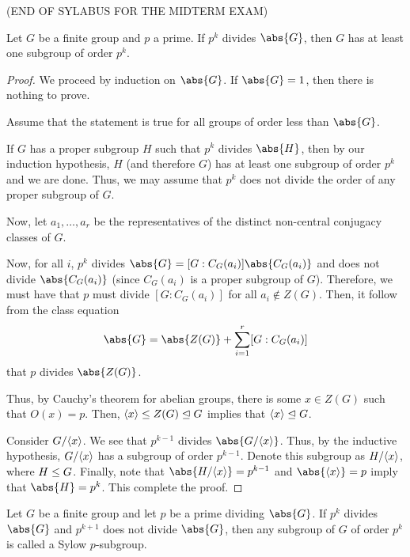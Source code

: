 \documentclass[11pt]{penrose}
\begin{document}
(END OF SYLABUS FOR THE MIDTERM EXAM)

\begin{nthm}
    Let $G$ be a finite group and $p$ a prime. If $p^{k}$ divides $\abs{G}$, then $G$ has at least one subgroup of order $p^{k}$.
\end{nthm}
\begin{proof}
    We proceed by induction on $\abs{G}$. If $\abs{G} = 1$, then there is nothing to prove.

    Assume that the statement is true for all groups of order less than $\abs{G}$.

    If $G$ has a proper subgroup $H$ such that $p^{k}$ divides $\abs{H}$, then by our induction hypothesis, $H$ (and therefore $G$) has at least one subgroup of order $p^{k}$ and we are done. Thus, we may assume that $p^{k}$ does not divide the order of any proper subgroup of $G$.

    Now, let $a_{1}, \dots, a_{r}$ be the representatives of the distinct non-central conjugacy classes of $G$.

    Now, for all $i$, $p^{k}$ divides $\abs{G} = [G : C_{G}(a_{i})] \abs{C_{G}(a_{i})}$ and does not divide $\abs{C_{G}(a_{i})}$ (since $C_{G}(a_{i})$ is a proper subgroup of $G$). Therefore, we must have that $p$ must divide $[G : C_{G}(a_{i})]$ for all $a_{i} \notin Z(G)$. Then, it follow from the class equation
    \begin{equation*}
        \abs{G} = \abs{Z(G)} + \sum_{i=1}^{r} \comm{G : C_{G}(a_{i})}
    \end{equation*}
    that $p$ divides $\abs{Z(G)}$.

    Thus, by Cauchy's theorem for abelian groups, there is some $x \in Z(G)$ such that $O(x) = p$. Then, $\langle x\rangle \mathrel{\leq} Z(G) \mathrel{\trianglelefteq} G$ implies that $\langle x\rangle \mathrel{\trianglelefteq} G$.

    Consider $G / \langle x\rangle$. We see that $p^{k-1}$ divides $\abs{G / \cyclic{x}}$. Thus, by the inductive hypothesis, $G / \langle x\rangle$ has a subgroup of order $p^{k-1}$. Denote this subgroup as $H / \langle x\rangle$, where $H \mathrel{\leq} G$. Finally, note that $\abs{ H / \cyclic{x} } = p^{k-1}$ and $\abs{\cyclic{x}} = p$ imply that $\abs{H} = p^{k}$. This complete the proof.
\end{proof}

\begin{ndfn}
    Let $G$ be a finite group and let $p$ be a prime dividing $\abs{G}$. If $p^{k}$ divides $\abs{G}$ and $p^{k+1} $ does not divide $\abs{G}$, then any subgroup of $G$ of order $p^{k}$ is called a Sylow $p$-subgroup.
\end{ndfn}
\end{document}
